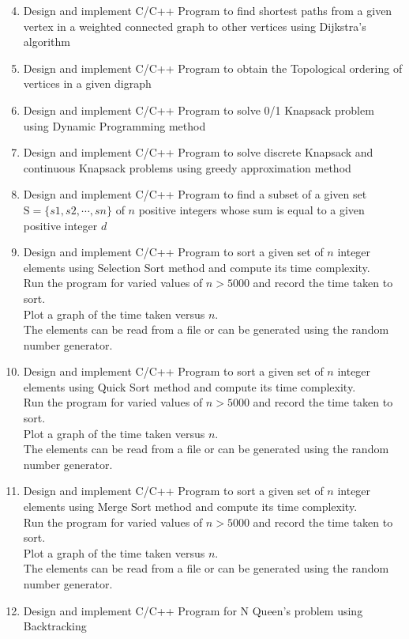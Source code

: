 \documentclass{article}
\begin{document}
	\begin{enumerate}[label=\arabic*. ] \setcounter{enumi}{3}
		\item Design and implement C/C++ Program to find shortest paths from a given vertex in a
			weighted connected graph to other vertices using Dijkstra's algorithm
		\item Design and implement C/C++ Program to obtain the Topological ordering of vertices in a
			given digraph
		\item Design and implement C/C++ Program to solve 0/1 Knapsack problem using Dynamic
			Programming method
		\item Design and implement C/C++ Program to solve discrete Knapsack and continuous Knapsack
			problems using greedy approximation method
		\item Design and implement C/C++ Program to find a subset of a given set
			$\text{S}=\{s1,s2,\cdots,sn\}$ of $n$ positive integers whose sum is equal to a given
			positive integer $d$
		\item Design and implement C/C++ Program to sort a given set of $n$ integer elements using
			Selection Sort method and compute its time complexity. \\
			Run the program for varied values of $n>5000$ and record the time taken to sort. \\
			Plot a graph of the time taken versus $n$. \\
			The elements can be read from a file or can be generated using the random number
			generator.
		\item Design and implement C/C++ Program to sort a given set of $n$ integer elements using
			Quick Sort method and compute its time complexity. \\
			Run the program for varied values of $n>5000$ and record the time taken to sort. \\
			Plot a graph of the time taken versus $n$. \\
			The elements can be read from a file or can be generated using the random number
			generator.
		\item Design and implement C/C++ Program to sort a given set of $n$ integer elements using
			Merge Sort method and compute its time complexity. \\
			Run the program for varied values of $n>5000$ and record the time taken to sort. \\
			Plot a graph of the time taken versus $n$. \\
			The elements can be read from a file or can be generated using the random number
			generator.
		\item Design and implement C/C++ Program for N Queen's problem using Backtracking
	\end{enumerate} \newpage
\end{document}
